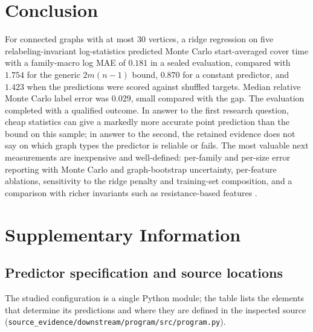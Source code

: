 \documentclass{article}
\begin{document}
\section{Conclusion}
For connected graphs with at most $30$ vertices, a ridge regression on five relabeling-invariant log-statistics predicted Monte Carlo start-averaged cover time with a family-macro log MAE of $0.181$ in a sealed evaluation, compared with $1.754$ for the generic $2m(n-1)$ bound, $0.870$ for a constant predictor, and $1.423$ when the predictions were scored against shuffled targets. Median relative Monte Carlo label error was $0.029$, small compared with the gap. The evaluation completed with a qualified outcome. In answer to the first research question, cheap statistics can give a markedly more accurate point prediction than the bound on this sample; in answer to the second, the retained evidence does not say on which graph types the predictor is reliable or fails. The most valuable next measurements are inexpensive and well-defined: per-family and per-size error reporting with Monte Carlo and graph-bootstrap uncertainty, per-feature ablations, sensitivity to the ridge penalty and training-set composition, and a comparison with richer invariants such as resistance-based features \citep{Doyle1984RandomWA}.

\clearpage



\clearpage
\appendix
\section{Supplementary Information}

\subsection{Predictor specification and source locations}
The studied configuration is a single Python module; the table lists the elements that determine its predictions and where they are defined in the inspected source (\texttt{source\_evidence/downstream/program/src/program.py}). %
\end{document}
